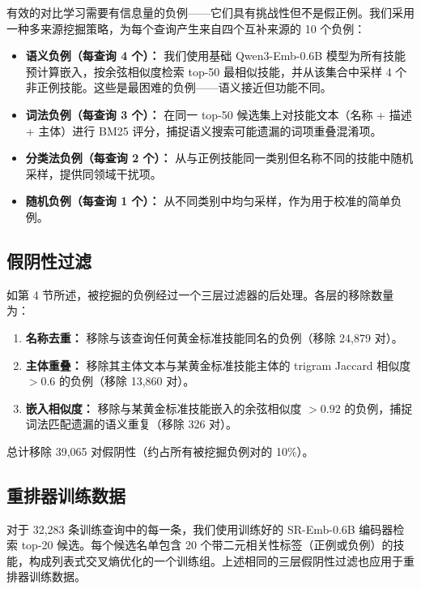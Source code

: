 \documentclass[11pt,UTF8,fontset=fandol]{ctexart}
\begin{document}
有效的对比学习需要有信息量的负例——它们具有挑战性但不是假正例。我们采用一种多来源挖掘策略，为每个查询产生来自四个互补来源的 10 个负例：

\begin{itemize}[leftmargin=2em]
\item \textbf{语义负例（每查询 4 个）：} 我们使用基础 Qwen3-Emb-0.6B 模型为所有技能预计算嵌入，按余弦相似度检索 top-50 最相似技能，并从该集合中采样 4 个非正例技能。这些是最困难的负例——语义接近但功能不同。
\item \textbf{词法负例（每查询 3 个）：} 在同一 top-50 候选集上对技能文本（名称 + 描述 + 主体）进行 BM25 评分，捕捉语义搜索可能遗漏的词项重叠混淆项。
\item \textbf{分类法负例（每查询 2 个）：} 从与正例技能同一类别但名称不同的技能中随机采样，提供同领域干扰项。
\item \textbf{随机负例（每查询 1 个）：} 从不同类别中均匀采样，作为用于校准的简单负例。
\end{itemize}

\subsection{假阴性过滤}

如第 4 节所述，被挖掘的负例经过一个三层过滤器的后处理。各层的移除数量为：

\begin{enumerate}[leftmargin=2em]
\item \textbf{名称去重：} 移除与该查询任何黄金标准技能同名的负例（移除 24,879 对）。
\item \textbf{主体重叠：} 移除其主体文本与某黄金标准技能主体的 trigram Jaccard 相似度 $> 0.6$ 的负例（移除 13,860 对）。
\item \textbf{嵌入相似度：} 移除与某黄金标准技能嵌入的余弦相似度 $> 0.92$ 的负例，捕捉词法匹配遗漏的语义重复（移除 326 对）。
\end{enumerate}

总计移除 39,065 对假阴性（约占所有被挖掘负例对的 10\%）。

\subsection{重排器训练数据}

对于 32,283 条训练查询中的每一条，我们使用训练好的 SR-Emb-0.6B 编码器检索 top-20 候选。每个候选名单包含 20 个带二元相关性标签（正例或负例）的技能，构成列表式交叉熵优化的一个训练组。上述相同的三层假阴性过滤也应用于重排器训练数据。
\end{document}
